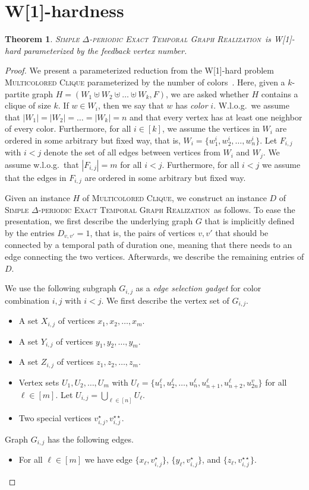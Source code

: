 \documentclass[11pt,a4paper]{article}
\newtheorem{theorem}{Theorem}
\theoremstyle{remark}
\theoremstyle{definition}
\newcommand{\deltaExactLong}{\textsc{Simple $\Delta$-periodic Exact Temporal Graph Realization}}
\begin{document}
\section{W[1]-hardness}
\begin{theorem}\label{thm:W1wrtFVS}
    \deltaExactLong\ is W[1]-hard parameterized by the feedback vertex number.
\end{theorem}
\begin{proof}
    We present a parameterized reduction from the W[1]-hard problem \textsc{Multicolored Clique} parameterized by the number of colors~\cite{fellows2009multipleinterval}.  Here, given a $k$-partite graph $H=(W_1\uplus W_2 \uplus\ldots\uplus W_k, F)$, we are asked whether $H$ contains a clique of size $k$. If $w\in W_i$, then we say that $w$ has \emph{color} $i$. W.l.o.g.\ we assume that $|W_1|=|W_2|=\ldots=|W_k|=n$ and that every vertex has at least one neighbor of every color. 
    Furthermore, for all $i\in[k]$, we assume the vertices in $W_i$ are ordered in some arbitrary but fixed way, that is, $W_i=\{w^i_1,w^i_2,\ldots,w^i_n\}$.
    Let $F_{i,j}$ with $i<j$ denote the set of all edges between vertices from $W_i$ and $W_j$. We assume w.l.o.g.\ that $|F_{i,j}|=m$ for all $i< j$.
    Furthermore, for all $i<j$ we assume that the edges in $F_{i,j}$ are ordered in some arbitrary but fixed way.

    Given an instance $H$ of \textsc{Multicolored Clique}, we construct an instance $D$ of \deltaExactLong\ as follows. To ease the presentation, we first describe the underlying graph $G$ that is implicitly defined by the entries $D_{v,v'}=1$, that is, the pairs of vertices $v,v'$ that should be connected by a temporal path of duration one, meaning that there needs to an edge connecting the two vertices. Afterwards, we describe the remaining entries of $D$.

    We use the following subgraph $G_{i,j}$ as a \emph{edge selection gadget} for color combination $i,j$ with $i<j$. We first describe the vertex set of $G_{i,j}$.
    \begin{itemize}
        \item A set $X_{i,j}$ of vertices $x_1, x_2, \ldots, x_m$.
        \item A set $Y_{i,j}$ of vertices $y_1, y_2, \ldots, y_m$.
        \item A set $Z_{i,j}$ of vertices $z_1, z_2, \ldots, z_m$.
        \item Vertex sets $U_1, U_2, \ldots, U_m$ with $U_\ell=\{u^\ell_1, u^\ell_2,\ldots, u^\ell_n, u^\ell_{n+1}, u^\ell_{n+2}, u^v_{2n}\}$ for all $\ell\in[m]$. Let $U_{i,j}=\bigcup_{\ell\in[n]} U_\ell$.
        \item Two special vertices $v_{i,j}^\star,v_{i,j}^{\star\star}$.
    \end{itemize}
    Graph $G_{i,j}$ has the following edges.
    \begin{itemize}
        \item For all $\ell\in [m]$ we have edge $\{x_\ell,v_{i,j}^\star\}$, $\{y_\ell,v_{i,j}^\star\}$, and $\{z_\ell,v_{i,j}^{\star\star}\}$. 


\end{itemize}
\end{proof}
\end{document}
